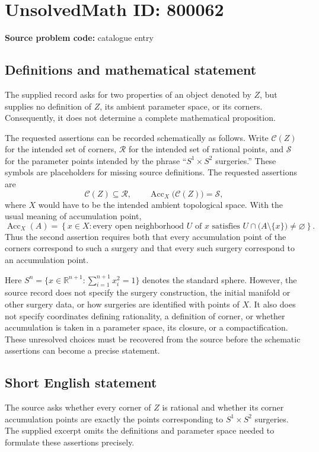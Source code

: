 \documentclass[11pt]{article}
\newcommand{\R}{\mathbb{R}}
\begin{document}
\section*{UnsolvedMath ID: 800062}
\textbf{Source problem code:} catalogue entry
\subsection{Definitions and mathematical statement}
The supplied record asks for two properties of an object denoted by \(Z\), but supplies no definition of \(Z\), its ambient parameter space, or its corners. Consequently, it does not determine a complete mathematical proposition.

The requested assertions can be recorded schematically as follows. Write \(\mathcal C(Z)\) for the intended set of corners, \(\mathcal R\) for the intended set of rational points, and \(\mathcal S\) for the parameter points intended by the phrase ``\(S^1\times S^2\) surgeries.'' These symbols are placeholders for missing source definitions. The requested assertions are
\[
\mathcal C(Z)\subseteq\mathcal R,
\qquad
\operatorname{Acc}_{X}\bigl(\mathcal C(Z)\bigr)=\mathcal S,
\]
where \(X\) would have to be the intended ambient topological space. With the usual meaning of accumulation point,
\[
\operatorname{Acc}_{X}(A)
=
\left\{x\in X:\text{every open neighborhood }U\text{ of }x
\text{ satisfies }U\cap\bigl(A\setminus\{x\}\bigr)\ne\varnothing\right\}.
\]
Thus the second assertion requires both that every accumulation point of the corners correspond to such a surgery and that every such surgery correspond to an accumulation point.

Here \(S^n=\{x\in\R^{n+1}:\sum_{i=1}^{n+1}x_i^2=1\}\) denotes the standard sphere. However, the source record does not specify the surgery construction, the initial manifold or other surgery data, or how surgeries are identified with points of \(X\). It also does not specify coordinates defining rationality, a definition of corner, or whether accumulation is taken in a parameter space, its closure, or a compactification. These unresolved choices must be recovered from the source before the schematic assertions can become a precise statement.
\subsection{Short English statement}
The source asks whether every corner of \(Z\) is rational and whether its corner accumulation points are exactly the points corresponding to \(S^1\times S^2\) surgeries. The supplied excerpt omits the definitions and parameter space needed to formulate these assertions precisely.
\end{document}
